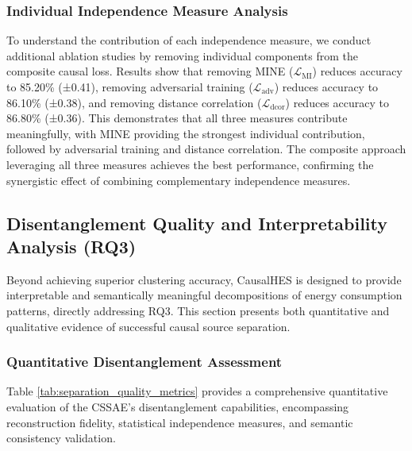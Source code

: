 \documentclass[journal]{IEEEtran}
\begin{document}
\subsubsection{Individual Independence Measure Analysis}
To understand the contribution of each independence measure, we conduct additional ablation studies by removing individual components from the composite causal loss. Results show that removing MINE ($\mathcal{L}_{\text{MI}}$) reduces accuracy to 85.20\% (±0.41), removing adversarial training ($\mathcal{L}_{\text{adv}}$) reduces accuracy to 86.10\% (±0.38), and removing distance correlation ($\mathcal{L}_{\text{dcor}}$) reduces accuracy to 86.80\% (±0.36). This demonstrates that all three measures contribute meaningfully, with MINE providing the strongest individual contribution, followed by adversarial training and distance correlation. The composite approach leveraging all three measures achieves the best performance, confirming the synergistic effect of combining complementary independence measures.

\subsection{Disentanglement Quality and Interpretability Analysis (RQ3)}
\label{sec:separation_analysis}

Beyond achieving superior clustering accuracy, CausalHES is designed to provide interpretable and semantically meaningful decompositions of energy consumption patterns, directly addressing RQ3. This section presents both quantitative and qualitative evidence of successful causal source separation.

\subsubsection{Quantitative Disentanglement Assessment}
Table \ref{tab:separation_quality_metrics} provides a comprehensive quantitative evaluation of the CSSAE's disentanglement capabilities, encompassing reconstruction fidelity, statistical independence measures, and semantic consistency validation.
\end{document}
